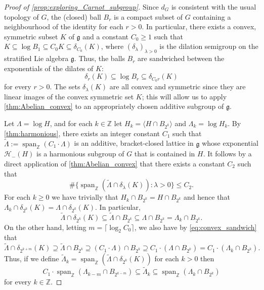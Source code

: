 \documentclass[11pt]{article}
\numberwithin{equation}{section}
\theoremstyle{plain}
\theoremstyle{definition}
\theoremstyle{remark}
\numberwithin{equation}{section}
\newcommand{\Z}{\mathbb Z}
\numberwithin{equation}{section}
\begin{document}
\begin{proof}[Proof of \cref{prop:exploring_Carnot_subgroup}]
Since $d_G$ is consistent with the usual topology of $G$, the (closed) ball $B_r$ is a compact subset of $G$ containing a neighbourhood of the identity for each $r>0$. In particular, there exists a convex, symmetric subset $K$ of $\mathfrak{g}$ and a constant $C_0 \geq 1$ such that $K \subseteq \log B_1 \subseteq C_0 K \subseteq \delta_{C_0}(K)$, where $(\delta_\lambda)_{\lambda>0}$ is the dilation semigroup on the stratified Lie algebra $\mathfrak{g}$. Thus, the balls $B_r$ are sandwiched between the exponentials of the dilates of $K$:
\begin{equation}
\label{eq:convex_sandwich}
\delta_r(K) \subseteq \log B_r \subseteq \delta_{C_0r}(K)
\end{equation}
for every $r>0$.
The sets $\delta_\lambda(K)$ are all convex and symmetric since they are linear images of the convex symmetric set $K$; this will allow us to apply \cref{thm:Abelian_convex} to an appropriately chosen additive subgroup of $\mathfrak{g}$.

\medskip

%
%
%
%
%
%

%

Let $\Lambda = \log H$, and for each $k\in \Z$ let $H_k = \langle H \cap B_{2^k} \rangle$ and $\Lambda_k = \log H_k$. By \cref{thm:harmonious}, there exists an integer constant $C_1$ such that $\tilde \Lambda := \operatorname{span}_\Z(C_1\cdot \Lambda)$ is an additive, bracket-closed lattice in $\mathfrak{g}$ whose exponential $\mathscr{H}_-(H)$ is a harmonious subgroup of $G$ that is contained in $H$.
   It follows by a direct application of \cref{thm:Abelian_convex} that there exists a constant $C_2$ such that
\[
\#\{ \operatorname{span}_\Z (\tilde \Lambda \cap \delta_\lambda(K)) : \lambda >0 \} \leq C_2.
\]
For each $k\geq 0$ we have trivially that $H_k \cap B_{2^k} = H \cap B_{2^k}$ and hence that $\Lambda_k \cap \delta_{2^k}(K)=\Lambda \cap \delta_{2^k}(K)$. In particular, 
\[\tilde \Lambda \cap \delta_{2^k}(K) \subseteq \tilde \Lambda \cap B_{2^k} \subseteq  \Lambda \cap B_{2^k} = \Lambda_k \cap B_{2^k}.\]
%
On the other hand, letting $m=\lceil \log_2 C_0 \rceil$, we also have by \eqref{eq:convex_sandwich} that
\[
\tilde \Lambda \cap \delta_{2^{k+m}}(K) \supseteq \tilde \Lambda \cap B_{2^k} \supseteq (C_1\cdot \Lambda) \cap B_{2^k} \supseteq C_1\cdot (\Lambda \cap B_{2^k}) = C_1\cdot (\Lambda_k \cap B_{2^k}).
\]
Thus, if we define $\tilde \Lambda_k = \operatorname{span}_\Z (\tilde \Lambda \cap \delta_{2^k}(K))$ for each $k>0$ then
\begin{equation}
\label{eq:lambda_tilde_in_the_middle}
C_1\cdot \operatorname{span}_\Z(\Lambda_{k-m} \cap B_{2^{k-m}}) \subseteq \tilde \Lambda_k \subseteq \operatorname{span}_\Z(\Lambda_k \cap B_{2^k})
\end{equation}
for every $k\in \Z$. 


\end{proof}
\end{document}

